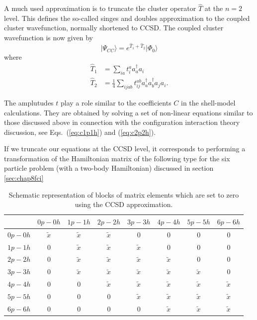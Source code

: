 A much used approximation is to truncate the cluster operator
$\hat{T}$ at the $n=2$ level. This defines the so-called singes and
doubles approximation to the coupled cluster wavefunction, normally
shortened to CCSD.
The coupled cluster wavefunction is now given by
  \begin{equation}
              \vert \Psi_{CC}\rangle = e^{\hat{T}_1 + \hat{T}_2} \vert
              \Phi_0\rangle
  \end{equation}
  where
          \begin{align*}
              \hat{T}_1 &= \sum_{ia} t_{i}^{a} a_{a}^\dagger a_i
              \\ \hat{T}_2 &= \frac{1}{4} \sum_{ijab} t_{ij}^{ab}
              a_{a}^\dagger a_{b}^\dagger a_{j} a_{i}.
          \end{align*}

  The amplutudes $t$ play a role similar to the coefficients $C$ in
  the shell-model calculations. They are obtained by solving a set of
  non-linear equations similar to those discussed above in connection
  with the configuration interaction theory  discussion, see Eqs.~(\ref{eq:c1p1h}) and (\ref{eq:c2p2h}). 

  If we truncate our equations at the CCSD level, it corresponds to
  performing a transformation of the Hamiltonian matrix of the
  following type for the six particle problem (with a two-body
  Hamiltonian) discussed in section \ref{sec:chap8fci}
  \begin{table}
\caption{Schematic representation of blocks of matrix elements which are set to zero using the CCSD approximation.}
  \begin{center}
  \begin{tabular}{cccccccc}
  \hline \multicolumn{1}{c}{ } & \multicolumn{1}{c}{ $0p-0h$ } &
  \multicolumn{1}{c}{ $1p-1h$ } & \multicolumn{1}{c}{ $2p-2h$ } &
  \multicolumn{1}{c}{ $3p-3h$ } & \multicolumn{1}{c}{ $4p-4h$ } &
  \multicolumn{1}{c}{ $5p-5h$ } & \multicolumn{1}{c}{ $6p-6h$ }
  \\ \hline $0p-0h$ & $\tilde{x}$ & $\tilde{x}$ & $\tilde{x}$ & 0 & 0
  & 0 & 0 \\ $1p-1h$ & 0 & $\tilde{x}$ & $\tilde{x}$ & $\tilde{x}$ & 0
  & 0 & 0 \\ $2p-2h$ & 0 & $\tilde{x}$ & $\tilde{x}$ & $\tilde{x}$ &
  $\tilde{x}$ & 0 & 0 \\ $3p-3h$ & 0 & $\tilde{x}$ & $\tilde{x}$ &
  $\tilde{x}$ & $\tilde{x}$ & $\tilde{x}$ & 0 \\ $4p-4h$ & 0 & 0 &
  $\tilde{x}$ & $\tilde{x}$ & $\tilde{x}$ & $\tilde{x}$ & $\tilde{x}$
  \\ $5p-5h$ & 0 & 0 & 0 & $\tilde{x}$ & $\tilde{x}$ & $\tilde{x}$ &
  $\tilde{x}$ \\ $6p-6h$ & 0 & 0 & 0 & 0 & $\tilde{x}$ & $\tilde{x}$ &
  $\tilde{x}$ \\ \hline
  \end{tabular}
  \end{center}
  \end{table}

